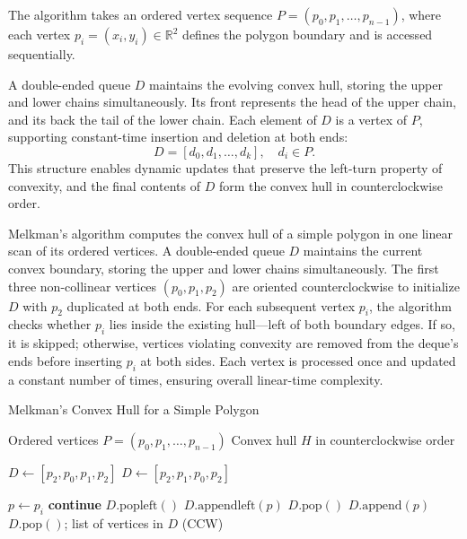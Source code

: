 \documentclass{article}
\begin{document}


The algorithm takes an ordered vertex sequence 
\(P = (p_0, p_1, \dots, p_{n-1})\), 
where each vertex \(p_i = (x_i, y_i) \in \mathbb{R}^2\) defines the polygon boundary and is accessed sequentially.

A double-ended queue \(D\) maintains the evolving convex hull, storing the upper and lower chains simultaneously.  
Its front represents the head of the upper chain, and its back the tail of the lower chain.  
Each element of \(D\) is a vertex of \(P\), supporting constant-time insertion and deletion at both ends:
\[
D = [d_0, d_1, \dots, d_k], \quad d_i \in P.
\]
This structure enables dynamic updates that preserve the left-turn property of convexity, and the final contents of \(D\) form the convex hull in counterclockwise order.


Melkman’s algorithm computes the convex hull of a simple polygon in one linear scan of its ordered vertices.  
A double-ended queue \(D\) maintains the current convex boundary, storing the upper and lower chains simultaneously.  
The first three non-collinear vertices \((p_0,p_1,p_2)\) are oriented counterclockwise to initialize \(D\) with \(p_2\) duplicated at both ends.  
For each subsequent vertex \(p_i\), the algorithm checks whether \(p_i\) lies inside the existing hull—left of both boundary edges.  
If so, it is skipped; otherwise, vertices violating convexity are removed from the deque’s ends before inserting \(p_i\) at both sides.  
Each vertex is processed once and updated a constant number of times, ensuring overall linear-time complexity.

\begin{algorithm}[H]
\caption{Melkman’s Convex Hull for a Simple Polygon}
\begin{algorithmic}[1]
\Require Ordered vertices \(P=(p_0,p_1,\dots,p_{n-1})\)
\Ensure Convex hull \(H\) in counterclockwise order

    \State \(D\gets[p_2,p_0,p_1,p_2]\)
\Else 
    \State \(D\gets[p_2,p_1,p_0,p_2]\)
\EndIf

    \State \(p\gets p_i\)
     \State \textbf{continue} \EndIf
     \State \(D.\text{popleft}()\) \EndWhile
    \State \(D.\text{appendleft}(p)\)
     \State \(D.\text{pop}()\) \EndWhile
    \State \(D.\text{append}(p)\)
\EndFor
\State \(D.\text{pop}()\); \Return list of vertices in \(D\) (CCW)
\end{algorithmic}
\end{algorithm}
\end{document}
